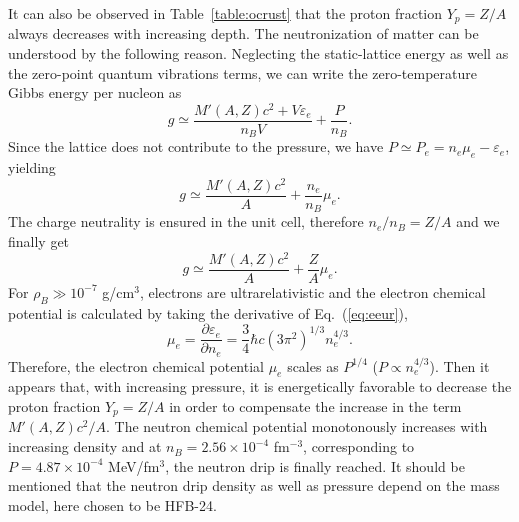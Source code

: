 It can also be observed in Table~\ref{table:ocrust} that the proton fraction 
$Y_p = Z/A$ always decreases with increasing depth. The
neutronization of matter can be understood by the following reason. Neglecting 
the static-lattice energy as well as the zero-point quantum vibrations
terms, we can write the zero-temperature Gibbs energy per nucleon as
%
\begin{equation}
  g \simeq \frac{M'(A,Z)c^2 + V\varepsilon_e}{n_BV} + \frac{P}{n_B}.
\end{equation}
%
Since the lattice does not contribute to the pressure, we have $P \simeq P_e =
n_e\mu_e - \varepsilon_e$, yielding
%
\begin{equation}
  g \simeq \frac{M'(A,Z)c^2}{A} + \frac{n_e}{n_B}\mu_e.
\end{equation}
%
The charge neutrality is ensured in the unit cell, therefore $n_e/n_B = Z/A$ 
and we finally get
%
\begin{equation}
  g \simeq \frac{M'(A,Z)c^2}{A} + \frac{Z}{A}\mu_e.
\end{equation}
%
For $\rho_B \gg 10^{-7}$ g/cm$^3$, electrons are ultrarelativistic and the
electron chemical potential is calculated by taking the derivative of
Eq.~(\ref{eq:eeur}),
%
\begin{equation}
  \mu_e = \frac{\partial \varepsilon_e}{\partial n_e} =
  \frac{3}{4}\hbar c(3\pi^2)^{1/3}n_e^{4/3}.
\end{equation}
%
Therefore, the electron chemical potential $\mu_e$ scales as $P^{1/4}$ ($P \propto
n_e^{4/3}$). Then it appears that, with increasing pressure, it is
energetically favorable to decrease the proton fraction $Y_p = Z/A$ in
order to compensate the increase in the term $M'(A,Z)c^2/A$. 
The neutron chemical potential monotonously increases with increasing density 
and at $n_B = 2.56\times 10^{-4}$ fm$^{-3}$, corresponding to $P = 4.87\times
10^{-4}$ MeV/fm$^{3}$, the neutron drip is finally
reached. It should be mentioned that the neutron drip density as well as
pressure depend on the mass model, here chosen to be HFB-24.

